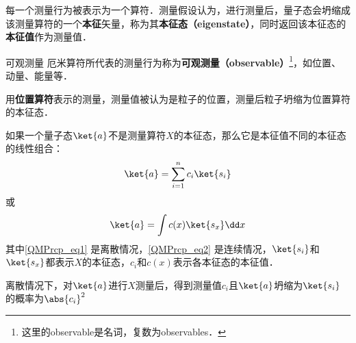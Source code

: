 每一个测量行为被表示为一个算符．测量假设认为，进行测量后，量子态会坍缩成该测量算符的一个\textbf{本征}矢量，称为其\textbf{本征态（eigenstate）}，同时返回该本征态的\textbf{本征值}作为测量值．


\begin{definition}{可观测量}
厄米算符所代表的测量行为称为\textbf{可观测量（observable）}\footnote{这里的observable是名词，复数为observables．}，如位置、动量、能量等．
\end{definition}


\begin{example}{}
用\textbf{位置算符}表示的测量，测量值被认为是粒子的位置，测量后粒子坍缩为位置算符的本征态．
\end{example}

如果一个量子态$\ket{a}$不是测量算符$X$的本征态，那么它是本征值不同的本征态的线性组合：
\begin{equation}\label{QMPrcp_eq1}
\ket{a} = \sum_{i=1}^{n} c_i\ket{s_i}
\end{equation}
或
\begin{equation}\label{QMPrcp_eq2}
\ket{a} = \int c(x)\ket{s_x}\dd x
\end{equation}
其中\autoref{QMPrcp_eq1} 是离散情况，\autoref{QMPrcp_eq2} 是连续情况，$\ket{s_i}$和$\ket{s_x}$都表示$X$的本征态，$c_i$和$c(x)$表示各本征态的本征值．

离散情况下，对$\ket{a}$进行$X$测量后，得到测量值$c_i$且$\ket{a}$坍缩为$\ket{s_i}$的概率为$\abs{c_i}^2$

